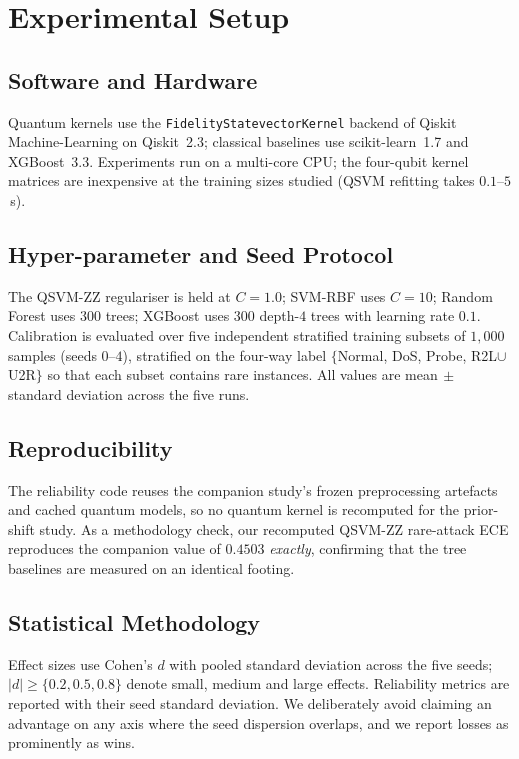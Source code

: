 \documentclass[journal]{IEEEtran}
\newcommand{\ZZ}{\textsc{ZZ}}
\newcommand{\QSVM}{QSVM-\ZZ}
\begin{document}
\section{Experimental Setup}\label{sec:setup}

\subsection{Software and Hardware}
Quantum kernels use the \texttt{FidelityStatevectorKernel} backend of
Qiskit Machine-Learning on Qiskit~2.3; classical baselines use
scikit-learn~1.7 and XGBoost~3.3. Experiments run on a multi-core CPU;
the four-qubit kernel matrices are inexpensive at the training sizes
studied (QSVM refitting takes $0.1$--$5$\,s).

\subsection{Hyper-parameter and Seed Protocol}
The \QSVM{} regulariser is held at $C{=}1.0$; SVM-RBF uses $C{=}10$;
Random Forest uses $300$ trees; XGBoost uses $300$ depth-$4$ trees with
learning rate $0.1$. Calibration is evaluated over five independent
stratified training subsets of $1{,}000$ samples (seeds $0$--$4$),
stratified on the four-way label $\{$Normal, DoS, Probe, R2L$\cup$U2R$\}$
so that each subset contains rare instances. All values are
mean$\,\pm\,$standard deviation across the five runs.

\subsection{Reproducibility}
The reliability code reuses the companion study's frozen preprocessing
artefacts and cached quantum models, so no quantum kernel is recomputed
for the prior-shift study. As a methodology check, our recomputed
\QSVM{} rare-attack ECE reproduces the companion value of $0.4503$
\emph{exactly}, confirming that the tree baselines are measured on an
identical footing.

\subsection{Statistical Methodology}
Effect sizes use Cohen's $d$ with pooled standard deviation across the
five seeds; $|d|\ge\{0.2,0.5,0.8\}$ denote small, medium and large
effects. Reliability metrics are reported with their seed standard
deviation. We deliberately avoid claiming an advantage on any axis where
the seed dispersion overlaps, and we report losses as prominently as
wins.
\end{document}
